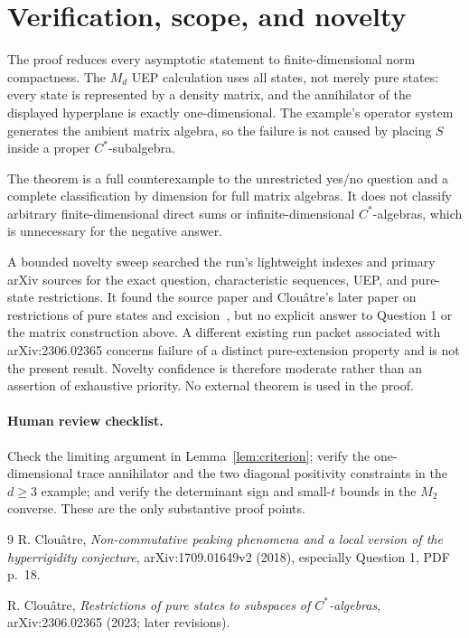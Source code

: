 \documentclass[11pt]{article}
\theoremstyle{remark}
\begin{document}
\section{Verification, scope, and novelty}

The proof reduces every asymptotic statement to finite-dimensional norm
compactness.  The $M_d$ UEP calculation uses all states, not merely pure
states: every state is represented by a density matrix, and the annihilator
of the displayed hyperplane is exactly one-dimensional.  The example's
operator system generates the ambient matrix algebra, so the failure is not
caused by placing $S$ inside a proper $C^*$-subalgebra.

The theorem is a full counterexample to the unrestricted yes/no question and
a complete classification by dimension for full matrix algebras.  It does not
classify arbitrary finite-dimensional direct sums or infinite-dimensional
$C^*$-algebras, which is unnecessary for the negative answer.

A bounded novelty sweep searched the run's lightweight indexes and primary
arXiv sources for the exact question, characteristic sequences, UEP, and
pure-state restrictions.  It found the source paper and Clou\^atre's later
paper on restrictions of pure states and excision~\cite{ClouatreRestrictions},
but no explicit answer to Question 1 or the matrix construction above.  A
different existing run packet associated with arXiv:2306.02365 concerns
failure of a distinct pure-extension property and is not the present result.
Novelty confidence is therefore moderate rather than an assertion of
exhaustive priority.  No external theorem is used in the proof.

\paragraph{Human review checklist.}
Check the limiting argument in Lemma~\ref{lem:criterion}; verify the
one-dimensional trace annihilator and the two diagonal positivity constraints
in the $d\geq3$ example; and verify the determinant sign and small-$t$ bounds
in the $M_2$ converse.  These are the only substantive proof points.

\begin{thebibliography}{9}
R. Clou\^atre,
\emph{Non-commutative peaking phenomena and a local version of the
hyperrigidity conjecture}, arXiv:1709.01649v2 (2018), especially Question 1,
PDF p.~18.

R. Clou\^atre,
\emph{Restrictions of pure states to subspaces of $C^*$-algebras},
arXiv:2306.02365 (2023; later revisions).
\end{thebibliography}
\end{document}
